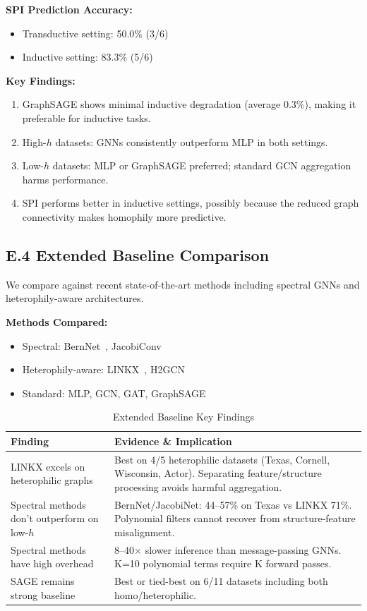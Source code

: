 \textbf{SPI Prediction Accuracy:}
\begin{itemize}
    \item Transductive setting: 50.0\% (3/6)
    \item Inductive setting: 83.3\% (5/6)
\end{itemize}

\textbf{Key Findings:}
\begin{enumerate}
    \item GraphSAGE shows minimal inductive degradation (average 0.3\%), making it preferable for inductive tasks.
    \item High-$h$ datasets: GNNs consistently outperform MLP in both settings.
    \item Low-$h$ datasets: MLP or GraphSAGE preferred; standard GCN aggregation harms performance.
    \item SPI performs better in inductive settings, possibly because the reduced graph connectivity makes homophily more predictive.
\end{enumerate}

\subsection*{E.4 Extended Baseline Comparison}

We compare against recent state-of-the-art methods including spectral GNNs and heterophily-aware architectures.

\textbf{Methods Compared:}
\begin{itemize}
    \item Spectral: BernNet~\cite{he2022bernnet}, JacobiConv~\cite{wang2022jacobi}
    \item Heterophily-aware: LINKX~\cite{lim2021large}, H2GCN~\cite{zhu2020beyond}
    \item Standard: MLP, GCN, GAT, GraphSAGE
\end{itemize}

\begin{table}[h]
\centering
\caption{Extended Baseline Key Findings}
\label{tab:extended_baseline_appendix}
\small
\begin{tabular}{p{3cm}p{9cm}}
\toprule
\textbf{Finding} & \textbf{Evidence \& Implication} \\
\midrule
LINKX excels on heterophilic graphs & Best on 4/5 heterophilic datasets (Texas, Cornell, Wisconsin, Actor). Separating feature/structure processing avoids harmful aggregation. \\
\midrule
Spectral methods don't outperform on low-$h$ & BernNet/JacobiNet: 44--57\% on Texas vs LINKX 71\%. Polynomial filters cannot recover from structure-feature misalignment. \\
\midrule
Spectral methods have high overhead & 8--40$\times$ slower inference than message-passing GNNs. K=10 polynomial terms require K forward passes. \\
\midrule
SAGE remains strong baseline & Best or tied-best on 6/11 datasets including both homo/heterophilic. \\
\bottomrule
\end{tabular}
\end{table}

